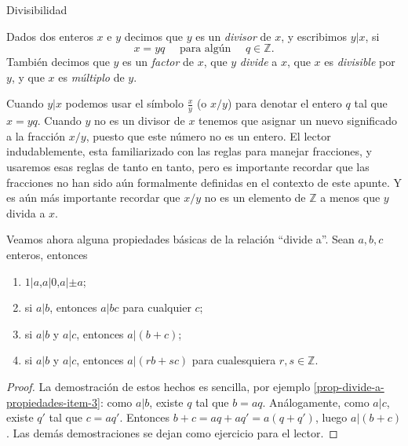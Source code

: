 \begin{section}{Divisibilidad}\label{seccion-divisivilidad}


\begin{definicion}Dados dos enteros $x$ e $y$ decimos que $y$ es un \textit{divisor} de $x$, y escribimos $y|x$, si
$$
x=yq\quad\text{ para algún }\quad q\in \mathbb Z.
$$
También decimos que $y$ es un \textit{factor} de $x$, que $y$ \textit{divide} a $x$, que $x$ es \textit{divisible} por $y$, y que $x$ es \textit{múltiplo} de $y$.
\end{definicion}

Cuando $y|x$ podemos usar el símbolo $\frac{x}{y}$ (o $x/y$) para denotar el entero $q$ tal que $ x=yq$. Cuando $y$ no es un divisor de $x$ tenemos que asignar un nuevo significado a la fracción $x/y$, puesto que este número no es un entero. El lector indudablemente, esta familiarizado con las reglas para manejar
fracciones, y usaremos esas reglas de tanto en tanto, pero es importante recordar que las fracciones no han sido aún formalmente definidas en el contexto de este apunte. Y es aún más importante recordar que $x/y$ no es un elemento de $\mathbb Z$ a menos que $y$ divida a $x$.


\begin{observacion}\label{prop-divide-a-propiedades} Veamos ahora alguna propiedades básicas de la relación ``divide a''. Sean $a,b,c$ enteros, entonces
\begin{enumerate}[label=\textit{\alph*)}]
\item\label{prop-divide-a-propiedades-item-1} $1|a$,\qquad $a|0$,\qquad $a|\pm a$;
\item\label{prop-divide-a-propiedades-item-2} si $a|b$, entonces $a|bc$ para cualquier $c$;
\item\label{prop-divide-a-propiedades-item-3} si $a|b$ y $a|c$, entonces $a|(b+c)$;
\item\label{prop-divide-a-propiedades-item-4} si $a|b$ y $a|c$, entonces $a|(rb+sc)$ para cualesquiera $r,s \in \mathbb Z$.
\end{enumerate}
\begin{proof}
La demostración de estos hechos es sencilla, por ejemplo \ref{prop-divide-a-propiedades-item-3}: como $a|b$, existe $q$ tal que $b = aq$. Análogamente, como $a|c$, existe $q'$ tal que $c = aq'$. Entonces $b+c = aq+aq' = a(q+q')$, luego $a|(b+c)$.  
Las demás demostraciones se dejan como ejercicio para el lector. 
\end{proof}
\end{observacion}



\end{section}
